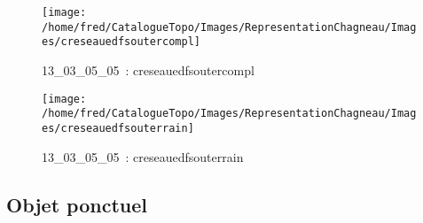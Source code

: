 \documentclass[12pt,titlepage]{book}
\begin{document}
\begin{figure}[h!]
  \begin{minipage}[t]{3cm}
    \begin{center}
      \texttt{[image: /home/fred/CatalogueTopo/Images/RepresentationChagneau/Images/creseauedfsoutercompl]}
      \caption[~13\_03\_05\_05]{\small{13\_03\_05\_05~:} \tiny{creseauedfsoutercompl}}\label{creseauedfsoutercompl}
    \end{center}
  \end{minipage}
  \begin{minipage}[t]{3cm}
    \begin{center}
      \texttt{[image: /home/fred/CatalogueTopo/Images/RepresentationChagneau/Images/creseauedfsouterrain]}
      \caption[~13\_03\_05\_05]{\small{13\_03\_05\_05~:} \tiny{creseauedfsouterrain}}\label{creseauedfsouterrain}
    \end{center}
  \end{minipage}
\end{figure}


\subsection{Objet ponctuel}
\noindent
\vspace{\baselineskip}
\end{document}

